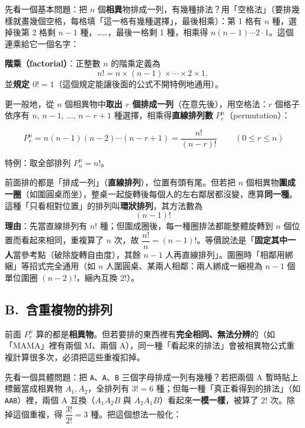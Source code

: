\documentclass[11pt]{article}
\begin{document}
先看一個基本問題：把 $n$ 個\textbf{相異}物排成一列，有幾種排法？用「空格法」（要排幾樣就畫幾個空格，每格填「這一格有幾種選擇」，最後相乘）：第 1 格有 $n$ 種，選掉後第 2 格剩 $n-1$ 種，……，最後一格剩 1 種，相乘得 $n(n-1)\cdots2\cdot1$。這個連乘給它一個名字：

\textbf{階乘（factorial）}：正整數 $n$ 的階乘定義為
$$n! = n\times(n-1)\times\cdots\times2\times1,$$
並\textbf{規定 $0!=1$}（這個規定能讓後面的公式不開特例地通用）。

更一般地，從 $n$ 個相異物中\textbf{取出 $r$ 個排成一列}（在意先後），用空格法：$r$ 個格子依序有 $n,\,n-1,\,\dots,\,n-r+1$ 種選擇，相乘得\textbf{直線排列數} $P^n_r$（permutation）：

$$\boxed{\,P^n_r = n(n-1)(n-2)\cdots(n-r+1) = \dfrac{n!}{(n-r)!}\,}\qquad(0\le r\le n)$$

特例：取全部排列 $P^n_n = n!$。

\medskip
前面排的都是「排成一列」（\textbf{直線排列}），位置有頭有尾。但若把 $n$ 個相異物\textbf{圍成一圈}（如圍圓桌而坐），整桌一起旋轉後每個人的左右鄰居都沒變，應算\textbf{同一種}。這種「只看相對位置」的排列叫\textbf{環狀排列}，其方法數為
$$\boxed{\,(n-1)!\,}$$
\textbf{理由}：先當直線排列有 $n!$ 種；但圍成圈後，每一種圈排法都能整體旋轉到 $n$ 個位置而看起來相同，重複算了 $n$ 次，故 $\dfrac{n!}{n}=(n-1)!$。等價說法是「\textbf{固定其中一人}當參考點（破除旋轉自由度），其餘 $n-1$ 人再直線排列」。圍圈時「相鄰用綁綑」等招式完全通用（如 $n$ 人圍圓桌、某兩人相鄰：兩人綁成一綑視為 $n-1$ 個單位圍圈 $(n-2)!$，綑內互換 $2!$）。


\subsection*{\sffamily B.\ 含重複物的排列}

前面 $P^n_r$ 算的都是\textbf{相異物}。但若要排的東西裡有\textbf{完全相同、無法分辨}的（如「MAMA」裡有兩個 M、兩個 A），同一種「看起來的排法」會被相異物公式重複計算很多次，必須把這些重複扣掉。

先看一個具體問題：把 \texttt{A}、\texttt{A}、\texttt{B} 三個字母排成一列有幾種？若把兩個 A 暫時貼上標籤當成相異物 $A_1,A_2$，全排列有 $3!=6$ 種；但每一種「真正看得到的排法」（如 \texttt{AAB}）裡，兩個 A 互換（$A_1A_2B$ 與 $A_2A_1B$）看起來\textbf{一模一樣}，被算了 $2!$ 次。除掉這個重複，得 $\dfrac{3!}{2!}=3$ 種。把這個想法一般化：
\end{document}
